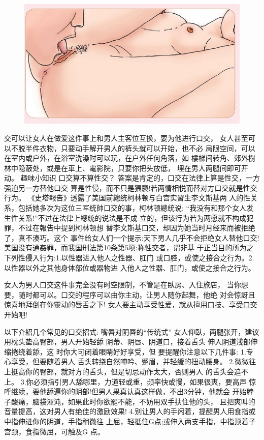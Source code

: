 \documentclass[12pt,UTF8]{ctexbook}
\begin{document}
\begin{figure}[htbp]
	\centering
	\includegraphics[width=0.7\linewidth]{19}
	\caption{}
	\label{fig:1}
\end{figure}

交可以让女人在做爱这件事上和男人主客位互换，要为他进行口交，
女人甚至可以不脱半件衣物，只要动手解开男人的裤头就可以开始，也不必
局限空间，可以在室内或户外，在浴室洗澡时可以玩，在户外任何角落，如
樓梯间转角、郊外樹林中隐蔽处，或是在車上、電影院，只要你把头放低，
埋在男人两腿间即可开动。
趣味小知识
口交算不算性交？
答案是肯定的，口交在法律上算是性交，一方强迫另一方替他口交
算是性侵，而不只是猥褻!若两情相悦而替对方口交就是性交行为。
《史塔報告》透露了美国前總统柯林顿与白宫实習生李文斯基两
人的性关系，包括她多次为这位三军统帥口交的事，柯林顿總统说:
“我没有和那个女人发生性关系!”不过在法律上總统的说法是不成
立的，但该行为若为两愿就不构成犯罪，不过在報告中提到柯林顿想
替李文斯基口交，却因为她当时月经来而被拒绝了，真不湊巧。这个
事件给女人们一个提示:天下男人几乎不会拒绝女人替他口交!
美国没有通姦罪，而我国刑法第10条第5项:称性交者，谓非基
于正当目的所为之下列性侵入行为:1.以性器进入他人之性器、肛门
或口腔，或使之接合之行为。2.以性器以外之其他身体部位或器物进
入他人之性器、肛门，或使之接合之行为。

女人为男人口交这件事完全没有时空限制，不管是在臥房、入住旅店，
当你想要，随时都可以。口交的程序可以由你主动，让男人随你起舞，他绝
对会惊訝且惊喜地拜倒在你靈动的唇舌之下!
女人要主动享受性爱，就从擅用口技、享受口交开始吧!

以下介紹几个常见的口交招式:
嘴唇对阴唇的“传统式”
女人仰臥，两腿张开，建议
用枕头垫高臀部，男人开始轻舔
阴蒂、阴唇、阴道口，接着舌头
伸入阴道浅部伸缩捲绕着舔，这
时你大可闭着眼睛好好享受，但
要提醒你注意以下几件事:
1.专心享受，但要随着男人
舌头转绕自然呻吟、蹙眉，并轻缓的扭动腰身。
2.微微往上挺高你的臀部，就对方的舌头，但是切忌动作太大，否则男人
的舌头会追不上。
3.你必须指引男人舔哪里，力道轻或重，频率快或慢，如果很爽，要高声
惊呼继续，要他舔遍你的阴部!但男人果真认真这样做，不出3分钟，他就会
开始脖子酸痛，脑袋渾沌，如果此时你欲罷不能，不妨用双手扶住他的头，
且把爽叫的音量提高，这对男人有绝佳的激励效果!
4.别让男人的手闲着，提醒男人用食指或中指伸进你的阴道，手指稍微往
上屈，轻抵住G点;或伸入两支手指，中指顶着子宫颈，食指微屈，可触及G
点。
\end{document}
